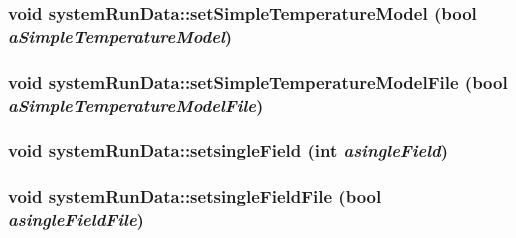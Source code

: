 \label{classsystem_run_data_aa1e564e131ec1b124b81e107aba4e5d6}
\hypertarget{classsystem_run_data_a7bf798f47dabdd0d438e18d69d3f0d9c}{
\subsubsection[{setSimpleTemperatureModel}]{\setlength{\rightskip}{0pt plus 5cm}void systemRunData::setSimpleTemperatureModel (bool {\em aSimpleTemperatureModel})}}
\label{classsystem_run_data_a7bf798f47dabdd0d438e18d69d3f0d9c}
\hypertarget{classsystem_run_data_a9c1740e87b52c0f3eb02f61435ffe7b6}{
\subsubsection[{setSimpleTemperatureModelFile}]{\setlength{\rightskip}{0pt plus 5cm}void systemRunData::setSimpleTemperatureModelFile (bool {\em aSimpleTemperatureModelFile})}}
\label{classsystem_run_data_a9c1740e87b52c0f3eb02f61435ffe7b6}
\hypertarget{classsystem_run_data_a85126e0068d4d9835df4edb865032218}{
\subsubsection[{setsingleField}]{\setlength{\rightskip}{0pt plus 5cm}void systemRunData::setsingleField (int {\em asingleField})}}
\label{classsystem_run_data_a85126e0068d4d9835df4edb865032218}
\hypertarget{classsystem_run_data_aee963fbc3e4c6d592f19f49d22ed9cfd}{
\subsubsection[{setsingleFieldFile}]{\setlength{\rightskip}{0pt plus 5cm}void systemRunData::setsingleFieldFile (bool {\em asingleFieldFile})}}

